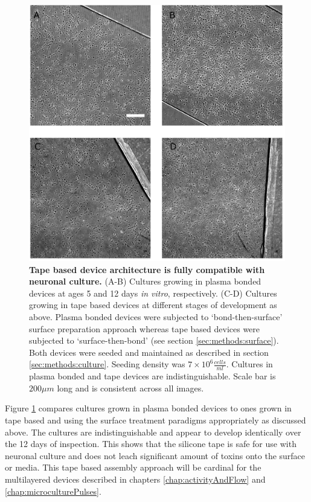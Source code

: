         \begin{figure}[!htb]
            \centering
            \includegraphics[width=15cm]{chapter4/figures/tapeCultures/tapeCultures.jpg}
            \caption[Comparison between cultures growing in plasma bonded devices and tape based devices]{\textbf{Tape based device architecture is fully compatible with neuronal culture.} (A-B) Cultures growing in plasma bonded devices at ages 5 and 12 days \textit{in vitro}, respectively. (C-D) Cultures growing in tape based devices at different stages of development as above. Plasma bonded devices were subjected to `bond-then-surface' surface preparation approach whereas tape based devices were subjected to `surface-then-bond' (see section \ref{sec:methods:surface}). Both devices were seeded and maintained as described in section \ref{sec:methods:culture}. Seeding density was \(7\times10^6 \frac{cells}{ml}\). Cultures in plasma bonded and tape devices are indistinguishable. Scale bar is \(200 \mu m\) long and is consistent across all images.}
            \label{fig:devices:tapeCultures}
        \end{figure}

        Figure \ref{fig:devices:tapeCultures} compares cultures grown in plasma bonded devices to ones grown in tape based and using the surface treatment paradigms appropriately as discussed above. The cultures are indistinguishable and appear to develop identically over the 12 days of inspection. This shows that the silicone tape is safe for use with neuronal culture and does not leach significant amount of toxins onto the surface or media. This tape based assembly approach will be cardinal for the multilayered devices described in chapters \ref{chap:activityAndFlow} and \ref{chap:microculturePulses}.


